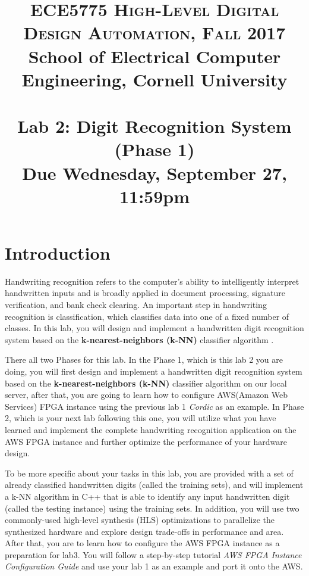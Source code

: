 \documentclass[paper=letter, fontsize=10pt]{scrartcl} %
\title{	
\normalfont \normalsize 
\textsc{ECE5775 High-Level Digital Design Automation, Fall 2017} \\  
School of Electrical Computer Engineering, Cornell University \\ [11pt]%
\horrule{0.5pt} \\[0.4cm] %
\large Lab 2: Digit Recognition System (Phase 1) \\ %
\small Due Wednesday, September 27, 11:59pm
\horrule{0.5pt} \\[0.5cm] %
\vspace{-15ex}}
\date{}
\numberwithin{equation}{section} %
\numberwithin{figure}{section} %
\numberwithin{table}{section} %
\def\awstutorial{\textit{AWS FPGA Instance Configuration Guide }}
\begin{document}
\maketitle %
\section{Introduction}


Handwriting recognition refers to the computer's ability to intelligently interpret handwritten inputs and is broadly applied in document processing, signature verification, and bank check clearing. An important step in handwriting recognition is classification, which classifies data into one of a fixed number of classes. In this lab, you will design and implement a handwritten digit recognition system based on the \textbf{k-nearest-neighbors (k-NN)} classifier algorithm \cite{knn}. 


There all two Phases for this lab. In the Phase 1, which is this lab 2 you are doing, you will first design and implement a handwritten digit recognition system based on the \textbf{k-nearest-neighbors (k-NN)} classifier algorithm \cite{knn} on our local server, after that, you are going to learn how to configure AWS(Amazon Web Services) FPGA instance using the previous lab 1 \textit{Cordic} as an example. In Phase 2, which is your next lab following this one, you will utilize what you have learned and implement the complete handwriting recognition application on the AWS FPGA instance and further optimize the performance of your hardware design.

To be more specific about your tasks in this lab, you are provided with a set of already classified handwritten digits (called the training sets), and will implement a k-NN algorithm in C++ that is able to identify any input handwritten digit (called the testing instance) using the training sets. In addition, you will use two commonly-used high-level synthesis (HLS) optimizations to parallelize the synthesized hardware and explore design trade-offs in performance and area. After that,  you are to learn how to configure the AWS FPGA instance as a preparation for lab3. You will follow a step-by-step tutorial \awstutorial  and use your lab 1 as an example and port it onto the AWS.
\end{document}
